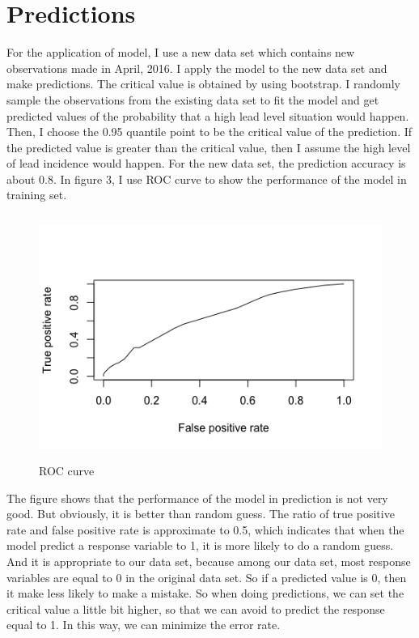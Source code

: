 \documentclass[letterpaper,12pt]{article}
\newcommand{\sihao}{\fontsize{14pt}{\baselineskip}\selectfont}       %
\begin{document}
\section*{\sihao Predictions}
For the application of model, I use a new data set which contains new observations made in April, 2016. I apply the model to the new data set and make predictions. The critical value is obtained by using bootstrap. I randomly sample the observations from the existing data set to fit the model and get predicted values of the probability that a high lead level situation would happen. Then, I choose the 0.95 quantile point to be the critical value of the prediction. If the predicted value is greater than the critical value, then I assume the high level of lead incidence would happen. For the new data set, the prediction accuracy is about 0.8. In figure 3, I use ROC curve to show the performance of the model in training set. 
\begin{center}
\begin{figure}[ht]
\quad  \quad \quad \includegraphics[width = 12cm, height = 8cm]{Roc_predict.png}
\vfill
\caption{ROC curve}
\label{fig:res}
\end{figure}
\end{center}
The figure shows that the performance of the model in prediction is not very good. But obviously, it is better than random guess. The ratio of true positive rate and false positive rate is approximate to 0.5, which indicates that when the model predict a response variable to 1, it is more likely to do a random guess. And it is appropriate to our data set, because among our data set, most response variables are equal to 0 in the original data set. So if a predicted value is 0, then it make less likely to make a mistake. So when doing predictions, we can set the critical value a little bit higher, so that we can avoid to predict the response equal to 1. In this way, we can minimize the error rate.
\end{document}
